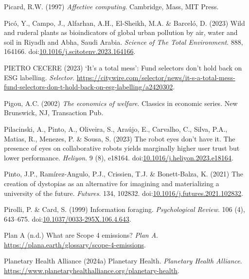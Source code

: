\documentclass[
  letterpaper,
  DIV=11,
  numbers=noendperiod]{scrartcl}
\newlength{\cslhangindent}
\newenvironment{CSLReferences}[2] %
 {\begin{list}{}{%
  \setlength{\itemindent}{0pt}
  \setlength{\leftmargin}{0pt}
  \setlength{\parsep}{0pt}
  \ifodd #1
   \setlength{\leftmargin}{\cslhangindent}
   \setlength{\itemindent}{-1\cslhangindent}
  \fi
  \setlength{\itemsep}{#2\baselineskip}}}
 {\end{list}}
\begin{document}
\begin{CSLReferences}{0}{1}
Picard, R.W. (1997) \emph{Affective computing}. Cambridge, Mass, MIT
Press.

Picó, Y., Campo, J., Alfarhan, A.H., El-Sheikh, M.A. \& Barceló, D.
(2023) Wild and ruderal plants as bioindicators of global urban
pollution by air, water and soil in {Riyadh} and {Abha}, {Saudi Arabia}.
\emph{Science of The Total Environment}. 888, 164166.
doi:\href{https://doi.org/10.1016/j.scitotenv.2023.164166}{10.1016/j.scitotenv.2023.164166}.

PIETRO CECERE (2023) {`{It}'s a total mess'}: {Fund} selectors don't
hold back on {ESG} labelling. \emph{Selector}.
\url{https://citywire.com/selector/news/it-s-a-total-mess-fund-selectors-don-t-hold-back-on-esg-labelling/a2420302}.

Pigou, A.C. (2002) \emph{The economics of welfare}. Classics in economic
series. New Brunswick, NJ, Transaction Pub.

Pilacinski, A., Pinto, A., Oliveira, S., Araújo, E., Carvalho, C.,
Silva, P.A., Matias, R., Menezes, P. \& Sousa, S. (2023) The robot eyes
don't have it. {The} presence of eyes on collaborative robots yields
marginally higher user trust but lower performance. \emph{Heliyon}. 9
(8), e18164.
doi:\href{https://doi.org/10.1016/j.heliyon.2023.e18164}{10.1016/j.heliyon.2023.e18164}.

Pinto, J.P., Ramírez-Angulo, P.J., Crissien, T.J. \& Bonett-Balza, K.
(2021) The creation of dystopias as an alternative for imagining and
materializing a university of the future. \emph{Futures}. 134, 102832.
doi:\href{https://doi.org/10.1016/j.futures.2021.102832}{10.1016/j.futures.2021.102832}.

Pirolli, P. \& Card, S. (1999) Information foraging. \emph{Psychological
Review}. 106 (4), 643--675.
doi:\href{https://doi.org/10.1037/0033-295X.106.4.643}{10.1037/0033-295X.106.4.643}.

Plan A (n.d.) What are {Scope} 4 emissions? \emph{Plan A}.
\url{https://plana.earth/glossary/scope-4-emissions}.

Planetary Health Alliance (2024a) Planetary {Health}. \emph{Planetary
Health Alliance}.
\url{https://www.planetaryhealthalliance.org/planetary-health}.


\end{CSLReferences}
\end{document}
